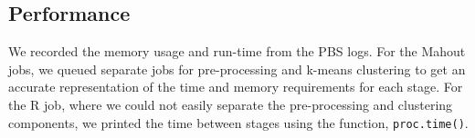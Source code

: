 \documentclass[twocolumn]{bmcart}%
\begin{document}
\subsection*{Performance}
We recorded the memory usage and run-time from the PBS logs. For the Mahout jobs, we queued separate jobs
for pre-processing and k-means clustering to get an accurate representation of the time and memory requirements for each stage.
For the R job, where we could not easily separate the pre-processing and clustering components, we printed the time between
stages using the function, \texttt{proc.time()}.


\end{document}
